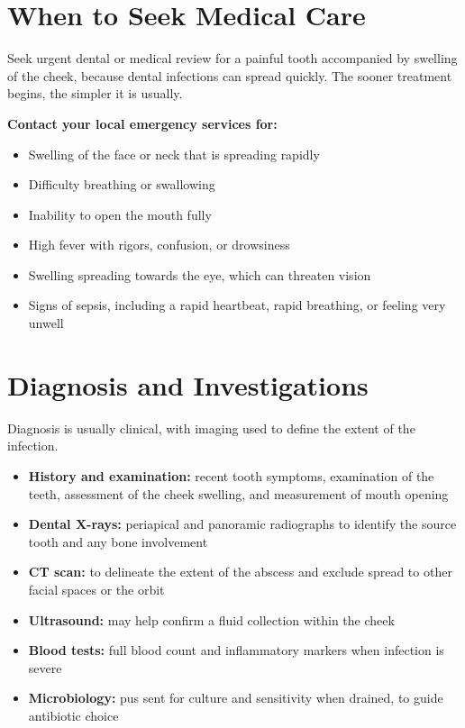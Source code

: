 \section*{When to Seek Medical Care}
Seek urgent dental or medical review for a painful tooth accompanied by swelling of the cheek, because dental infections can spread quickly. The sooner treatment begins, the simpler it is usually.

\textbf{Contact your local emergency services for:}
\begin{itemize}
    \item Swelling of the face or neck that is spreading rapidly
    \item Difficulty breathing or swallowing
    \item Inability to open the mouth fully
    \item High fever with rigors, confusion, or drowsiness
    \item Swelling spreading towards the eye, which can threaten vision
    \item Signs of sepsis, including a rapid heartbeat, rapid breathing, or feeling very unwell
\end{itemize}

\section*{Diagnosis and Investigations}
Diagnosis is usually clinical, with imaging used to define the extent of the infection.

\begin{itemize}
    \item \textbf{History and examination:} recent tooth symptoms, examination of the teeth, assessment of the cheek swelling, and measurement of mouth opening
    \item \textbf{Dental X-rays:} periapical and panoramic radiographs to identify the source tooth and any bone involvement
    \item \textbf{CT scan:} to delineate the extent of the abscess and exclude spread to other facial spaces or the orbit
    \item \textbf{Ultrasound:} may help confirm a fluid collection within the cheek
    \item \textbf{Blood tests:} full blood count and inflammatory markers when infection is severe
    \item \textbf{Microbiology:} pus sent for culture and sensitivity when drained, to guide antibiotic choice
\end{itemize}

